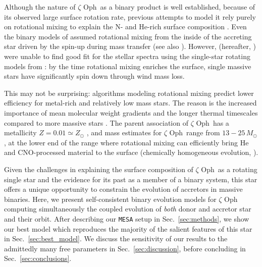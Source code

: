 \documentclass[twocolumn,twocolappendix,trackchanges]{aastex63}
\DeclareRobustCommand{\Secref}[1]{Sec.~\ref{#1}}
\newcommand{\zoph}{$\zeta$ Oph}
\begin{document}
Although the nature of \zoph\ as a binary product is well established,
because of its observed large surface rotation rate, previous attempts
to model it rely purely on rotational mixing to explain the N- and
He-rich surface composition \cite[e.g.,][]{maeder:00}. Even the binary
models of \cite{vanrensbergen:96} assumed rotational mixing from the
inside of the accreting star driven by the spin-up during mass
transfer (see also \citealt{cantiello:07}). However, \cite{villamariz:05}
(hereafter, ) were unable to find good fit
for the stellar spectra using the single-star rotating models from
\cite{meynet:00, meynet:03}: by the time rotational mixing enriches
the surface, single massive stars have significantly spin down through
wind mass loss.

This may not be surprising: algorithms modeling rotational mixing
predict lower efficiency for metal-rich and relatively low mass
stars. The reason is the increased importance of mean molecular weight
gradients and the longer thermal timescales compared to more massive
stars \citep[e.g.,][]{yoon:06, perna:14}. The parent association of
\zoph\ has a metallicity $Z=0.01\simeq Z_\odot$ \citep[based on
asteroseismology from][]{murphy:21}, and mass estimates for \zoph\
range from $13-25\,M_\odot$, at the lower end of the range where
rotational mixing can efficiently bring He and CNO-processed material to the
surface (chemically homogeneous evolution, \citealt{maeder:00}).

Given the challenges in explaining the surface composition of \zoph\
as a rotating single star and the evidence for its past as a member of
a binary system, this star offers a unique opportunity to constrain
the evolution of accretors in massive binaries.
Here, we present self-consistent binary evolution models for
$\zeta$ Oph computing simultaneously the coupled evolution of
\emph{both} donor and accretor star and their orbit. After describing
our \texttt{MESA} setup in \Secref{sec:methods}, we show our best model which
reproduces the majority of the salient features of this star in
\Secref{sec:best_model}. %
We discuss the
sensitivity of our results to the admittedly many free parameters
in
\Secref{sec:discussion}, before concluding in
\Secref{sec:conclusions}.
\end{document}
